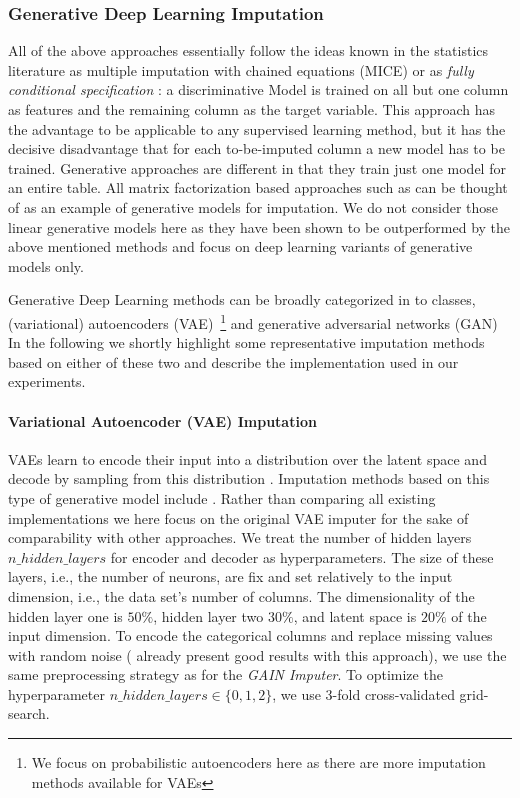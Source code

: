 \subsubsection{Generative Deep Learning Imputation}
%
All of the above approaches essentially follow the ideas known in the statistics literature as multiple imputation with chained equations (MICE) \citep{Little} or as {\em fully conditional specification} \citep{vanBuuren2018}: a discriminative Model is trained on all but one column as features and the remaining column as the target variable. This approach has the advantage to be applicable to any supervised learning method, but it has the decisive disadvantage that for each to-be-imputed column a new model has to be trained. Generative approaches are different in that they train just one model for an entire table. All matrix factorization based approaches such as \citep{Troyanskaya2001,Koren2009,Mazumder2010} can be thought of as an example of generative models for imputation. We do not consider those linear generative models here as they have been shown to be outperformed by the above mentioned methods and focus on deep learning variants of generative models only. 

Generative Deep Learning methods can be broadly categorized in to classes, (variational) autoencoders (VAE)~\citep{VAE}\footnote{We focus on probabilistic autoencoders here as there are more imputation methods available for VAEs} and generative adversarial networks (GAN) In the following we shortly highlight some representative imputation methods based on either of these two and describe the implementation used in our experiments. 

\paragraph{Variational Autoencoder (VAE) Imputation}
VAEs learn to encode their input into a distribution over the latent space and decode by sampling from this distribution \citep{VAE}. Imputation methods based on this type of generative model include \citep{HIVAE, VAE_for_genomic_data, VAEM}. Rather than comparing all existing implementations we here focus on the original VAE imputer for the sake of comparability with other approaches. We treat the number of hidden layers $n\_hidden\_layers$ for encoder and decoder as hyperparameters. The size of these layers, i.e., the number of neurons, are fix and set relatively to the input dimension, i.e., the data set's number of columns. The dimensionality of the hidden layer one is $50\%$, hidden layer two $30\%$, and latent space is $20\%$ of the input dimension.
 To encode the categorical columns and replace missing values with random noise  (\cite{CaminoVAE} already present good results with this approach), we use the same preprocessing strategy as for the \emph{GAIN Imputer}.
To optimize the hyperparameter $n\_hidden\_layers \in \{0, 1, 2\}$, we use 3-fold cross-validated grid-search.

